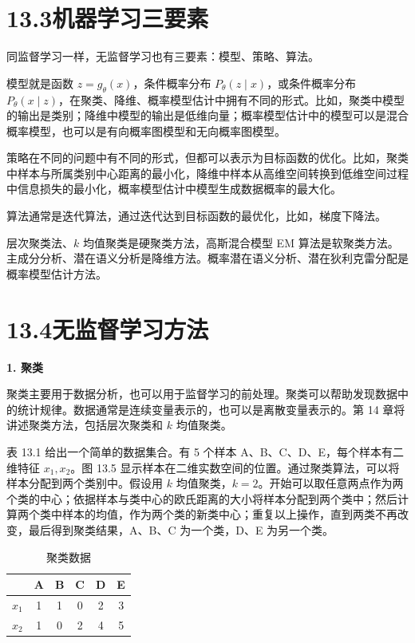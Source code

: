 \documentclass[UTF8,12pt,a4paper,fontset=fandol]{ctexart}
\begin{document}
\section*{13.3\quad 机器学习三要素}

同监督学习一样，无监督学习也有三要素：模型、策略、算法。

模型就是函数 $z=g_\theta(x)$，条件概率分布 $P_\theta(z\mid x)$，或条件概率分布 $P_\theta(x\mid z)$，在聚类、降维、概率模型估计中拥有不同的形式。比如，聚类中模型的输出是类别；降维中模型的输出是低维向量；概率模型估计中的模型可以是混合概率模型，也可以是有向概率图模型和无向概率图模型。

策略在不同的问题中有不同的形式，但都可以表示为目标函数的优化。比如，聚类中样本与所属类别中心距离的最小化，降维中样本从高维空间转换到低维空间过程中信息损失的最小化，概率模型估计中模型生成数据概率的最大化。

算法通常是迭代算法，通过迭代达到目标函数的最优化，比如，梯度下降法。

层次聚类法、$k$ 均值聚类是硬聚类方法，高斯混合模型 EM 算法是软聚类方法。主成分分析、潜在语义分析是降维方法。概率潜在语义分析、潜在狄利克雷分配是概率模型估计方法。

\section*{13.4\quad 无监督学习方法}

\noindent\textbf{1. 聚类}

聚类主要用于数据分析，也可以用于监督学习的前处理。聚类可以帮助发现数据中的统计规律。数据通常是连续变量表示的，也可以是离散变量表示的。第 14 章将讲述聚类方法，包括层次聚类和 $k$ 均值聚类。

表 13.1 给出一个简单的数据集合。有 5 个样本 A、B、C、D、E，每个样本有二维特征 $x_1,x_2$。图 13.5 显示样本在二维实数空间的位置。通过聚类算法，可以将样本分配到两个类别中。假设用 $k$ 均值聚类，$k=2$。开始可以取任意两点作为两个类的中心；依据样本与类中心的欧氏距离的大小将样本分配到两个类中；然后计算两个类中样本的均值，作为两个类的新类中心；重复以上操作，直到两类不再改变，最后得到聚类结果，A、B、C 为一个类，D、E 为另一个类。

\begin{table}[htbp]
\centering
\caption{聚类数据}
\begin{tabular}{c|ccccc}
\toprule
 & A & B & C & D & E\\
\midrule
$x_1$ & 1 & 1 & 0 & 2 & 3\\
$x_2$ & 1 & 0 & 2 & 4 & 5\\
\bottomrule
\end{tabular}
\end{table}
\end{document}
